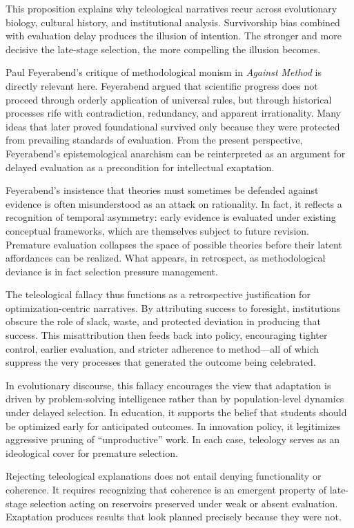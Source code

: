 \documentclass[11pt]{article}
\theoremstyle{definition}
\begin{document}
This proposition explains why teleological narratives recur across evolutionary biology, cultural history, and institutional analysis. Survivorship bias combined with evaluation delay produces the illusion of intention. The stronger and more decisive the late-stage selection, the more compelling the illusion becomes.

Paul Feyerabend’s critique of methodological monism in \emph{Against Method} is directly relevant here. Feyerabend argued that scientific progress does not proceed through orderly application of universal rules, but through historical processes rife with contradiction, redundancy, and apparent irrationality. Many ideas that later proved foundational survived only because they were protected from prevailing standards of evaluation. From the present perspective, Feyerabend’s epistemological anarchism can be reinterpreted as an argument for delayed evaluation as a precondition for intellectual exaptation.

Feyerabend’s insistence that theories must sometimes be defended against evidence is often misunderstood as an attack on rationality. In fact, it reflects a recognition of temporal asymmetry: early evidence is evaluated under existing conceptual frameworks, which are themselves subject to future revision. Premature evaluation collapses the space of possible theories before their latent affordances can be realized. What appears, in retrospect, as methodological deviance is in fact selection pressure management.

The teleological fallacy thus functions as a retrospective justification for optimization-centric narratives. By attributing success to foresight, institutions obscure the role of slack, waste, and protected deviation in producing that success. This misattribution then feeds back into policy, encouraging tighter control, earlier evaluation, and stricter adherence to method—all of which suppress the very processes that generated the outcome being celebrated.

In evolutionary discourse, this fallacy encourages the view that adaptation is driven by problem-solving intelligence rather than by population-level dynamics under delayed selection. In education, it supports the belief that students should be optimized early for anticipated outcomes. In innovation policy, it legitimizes aggressive pruning of ``unproductive'' work. In each case, teleology serves as an ideological cover for premature selection.

Rejecting teleological explanations does not entail denying functionality or coherence. It requires recognizing that coherence is an emergent property of late-stage selection acting on reservoirs preserved under weak or absent evaluation. Exaptation produces results that look planned precisely because they were not.
\end{document}
